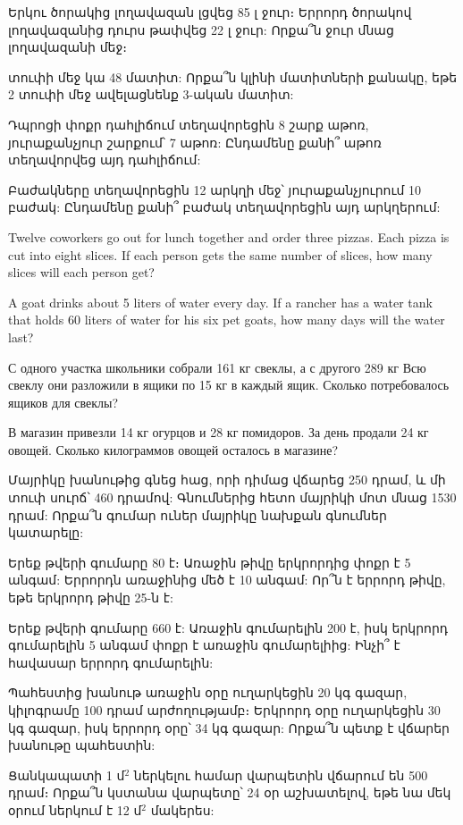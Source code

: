 \textproblem Երկու ծորակից լողավազան լցվեց 85 լ ջուր։
Երրորդ ծորակով լողավազանից դուրս թափվեց 22 լ ջուր: Որքա՞ն
ջուր մնաց լողավազանի մեջ։

 տուփի մեջ կա 48 մատիտ: Որքա՞ն կլինի
մատիտների քանակը, եթե 2 տուփի մեջ ավելացնենք 3-ական
մատիտ:

\textproblem Դպրոցի փոքր դահլիճում տեղավորեցին 8 շարք
աթոռ, յուրաքանչյուր շարքում՝ 7 աթոռ: Ընդամենը քանի՞ աթոռ
տեղավորվեց այդ դահլիճում:

\textproblem Բաժակները տեղավորեցին 12 արկղի մեջ՝
յուրաքանչյուրում 10 բաժակ: Ընդամենը քանի՞ բաժակ
տեղավորեցին այդ արկղերում:

\textproblem Twelve coworkers go out for lunch together
and order three pizzas. Each pizza is cut into eight
slices. If each person gets the same number of slices,
how many slices will each person get?

\textproblem A goat drinks about 5 liters of water every
day. If a rancher has a water tank that holds 60 liters
of water for his six pet goats, how many days will the
water last?

\textproblem С одного участка школьники собрали 161 кг
свеклы, а с другого 289 кг Всю свеклу они разложили в
ящики по 15 кг в каждый ящик. Сколько потребовалось
ящиков для свеклы?

\textproblem В магазин привезли 14 кг огурцов и
28 кг помидоров. За день продали 24 кг овощей.
Сколько килограммов овощей  осталось в магазине?


\textproblem Մայրիկը խանութից գնեց հաց, որի դիմաց
վճարեց 250 դրամ, և մի տուփ սուրճ՝ 460 դրամով:
Գնումներից հետո մայրիկի մոտ մնաց 1530 դրամ: Որքա՞ն
գումար ուներ մայրիկը նախքան գնումներ կատարելը:

\textproblem Երեք թվերի գումարը 80 է։ Առաջին թիվը
երկրորդից փոքր է 5 անգամ: Երրորդն առաջինից մեծ է 10
անգամ: Որ՞ն է երրորդ թիվը, եթե երկրորդ թիվը 25-ն է:

\textproblem Երեք թվերի գումարը 660 է: Առաջին գումարելին
200 է, իսկ երկրորդ գումարելին 5 անգամ փոքր է առաջին
գումարելիից: Ինչի՞ է հավասար երրորդ գումարելին:

\textproblem Պահեստից խանութ առաջին օրը ուղարկեցին
20 կգ գազար, կիլոգրամը 100 դրամ արժողությամբ։ Երկրորդ
օրը ուղարկեցին 30 կգ գազար, իսկ երրորդ օրը՝ 34 կգ
գազար: Որքա՞ն պետք է վճարեր խանութը պահեստին:

\textproblem Ցանկապատի 1 մ${}^2$ ներկելու համար վարպետին
վճարում են 500 դրամ։ Որքա՞ն կստանա վարպետը՝ 24 օր աշխատելով,
եթե նա մեկ օրում ներկում է 12 մ${}^2$ մակերես:

